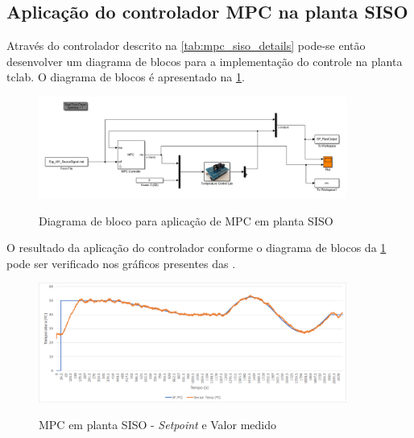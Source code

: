 \subsection{Aplicação do controlador MPC na planta SISO}
\label{subsec:siso_mpc_and_plant}

Através do controlador descrito na \cref{tab:mpc_siso_details} pode-se então desenvolver um diagrama
de blocos para a implementação do controle na planta \acrshort{tclab}. O diagrama de blocos é
apresentado na \cref{fig:siso_simulink_mpc_and_plant}.

\begin{figure}
    \caption{Diagrama de bloco para aplicação de MPC em planta SISO}
	\begin{center}
		\includegraphics[width=0.9\textwidth]{./5_images/Exp_402_Simulink.png} 
		\label{fig:siso_simulink_mpc_and_plant}
	\end{center}
    \centering
\end{figure}

O resultado da aplicação do controlador conforme o diagrama de blocos da \cref{fig:siso_simulink_mpc_and_plant}
pode ser verificado nos gráficos presentes das .

\begin{figure}
    \caption{MPC em planta SISO - \textit{Setpoint} e Valor medido}
	\begin{center}
		\includegraphics[width=0.9\textwidth]{./5_images/Exp_401_PlotResults_01_SS_x1_6.png} 
		\label{fig:siso_mpc_and_plant_plot01}
	\end{center}
    \centering
\end{figure}

